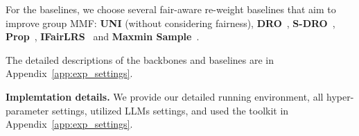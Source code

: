 For the baselines, we choose several fair-aware re-weight baselines that aim to improve group MMF: \textbf{UNI} (without considering fairness), \textbf{DRO}~\citep{hashimoto2018fairness}, \textbf{S-DRO}~\citep{wen2022distributionally}, \textbf{Prop}~\citep{hu2023adaptive}, \textbf{IFairLRS}~\citep{jiang2024itemside} and \textbf{Maxmin Sample}~\citep{abernethy2022active}. 



The detailed descriptions of the backbones and baselines are in Appendix~\ref{app:exp_settings}.

\textbf{Implemtation details.} We provide our detailed running environment, all hyper-parameter settings, utilized LLMs settings, and used the toolkit in Appendix~\ref{app:exp_settings}. 












